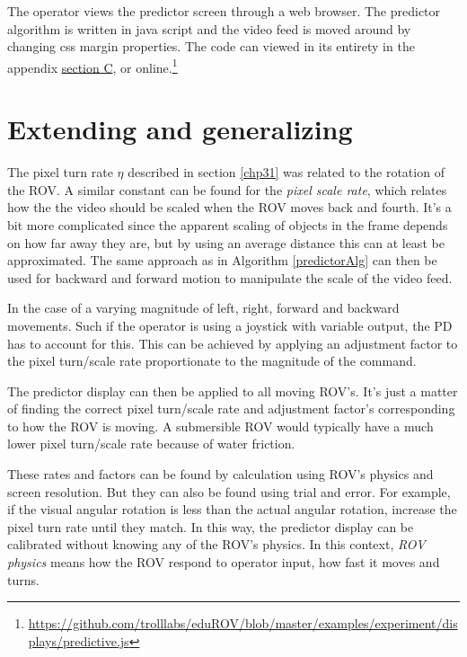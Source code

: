 \clearpage
\restoregeometry

The operator views the predictor screen through a web browser. The predictor algorithm is written in java script and the video feed is moved around by changing css margin properties. The code can viewed in its entirety in the appendix \hyperref[appPredict]{section C}, or online.\footnote{\url{https://github.com/trolllabs/eduROV/blob/master/examples/experiment/displays/predictive.js}}


\section{Extending and generalizing}\label{expand}

The pixel turn rate $\eta$ described in section \ref{chp31} was related to the rotation of the ROV. A similar constant can be found for the \emph{pixel scale rate}, which relates how the the video should be scaled when the ROV moves back and fourth. It's a bit more complicated since the apparent scaling of objects in the frame depends on how far away they are, but by using an average distance this can at least be approximated. The same approach as in Algorithm \ref{predictorAlg} can then be used for backward and forward motion to manipulate the scale of the video feed.

In the case of a varying magnitude of left, right, forward and backward movements. Such if the operator is using a joystick with variable output, the PD has to account for this. This can be achieved by applying an adjustment factor to the pixel turn/scale rate proportionate to the magnitude of the command.

The predictor display can then be applied to all moving ROV's. It's just a matter of finding the correct pixel turn/scale rate and adjustment factor's corresponding to how the ROV is moving. A submersible ROV would typically have a much lower pixel turn/scale rate because of water friction.

These rates and factors can be found by calculation using ROV's physics and screen resolution. But they can also be found using trial and error. For example, if the visual angular rotation is less than the actual angular rotation, increase the pixel turn rate until they match. In this way, the predictor display can be calibrated without knowing any of the ROV's physics. In this context, \emph{ROV physics} means how the ROV respond to operator input, how fast it moves and turns.